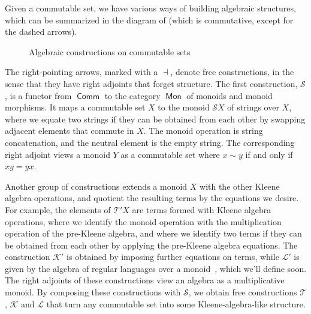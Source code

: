 \documentclass[11pt,a4paper]{amsart}
\theoremstyle{definition}
\DeclareMathOperator{\Mon}{\mathsf{Mon}}
\DeclareMathOperator{\preKA}{\mathsf{preKA}}
\DeclareMathOperator{\KA}{\mathsf{KA}}
\DeclareMathOperator{\Comm}{\mathsf{Comm}}
\DeclareMathOperator{\Set}{\mathsf{Set}}
\begin{document}
Given a commutable set, we have various ways of building algebraic structures,
which can be summarized in the diagram of  (which is
commutative, except for the dashed arrows).
\begin{figure}
\begin{center}
\end{center}
\caption{Algebraic constructions on commutable sets}
\label{fig:comm-set-diagram}
\end{figure}
The right-pointing arrows, marked with a $ \dashv $, denote free constructions,
in the sense that they have right adjoints that forget structure.  The first
construction, $\mathcal{S}$, is a functor from $\Comm$ to the category $\Mon$ of
monoids and monoid morphisms.  It maps a commutable set $X$ to the monoid
$\mathcal{S}X$ of strings over $X$, where we equate two strings if they can be
obtained from each other by swapping adjacent elements that commute in $X$.  The
monoid operation is string concatenation, and the neutral element is the empty
string.  The corresponding right adjoint views a monoid $Y$ as a commutable set
where $x \sim y$ if and only if $xy = yx$.

Another group of constructions extends a monoid $X$ with the other Kleene
algebra operations, and quotient the resulting terms by the equations we desire.
For example, the elements of $\mathcal{T}'X$ are terms formed with Kleene
algebra operations, where we identify the monoid operation with the
multiplication operation of the pre-Kleene algebra, and where we identify two
terms if they can be obtained from each other by applying the pre-Kleene algebra
equations.  The construction $\mathcal{K}'$ is obtained by imposing further
equations on terms, while $\mathcal{L}'$ is given by the algebra of regular
languages over a monoid~\cite{DBLP:conf/lics/Kozen97}, which we'll define soon.
The right adjoints of these constructions view an algebra as a multiplicative
monoid.  By composing these constructions with $\mathcal{S}$, we obtain free
constructions $\mathcal{T}$, $\mathcal{K}$ and $\mathcal{L}$ that turn any
commutable set into some Kleene-algebra-like structure.
\end{document}
